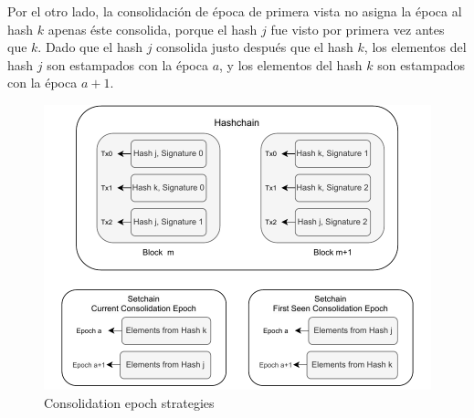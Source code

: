 %
Por el otro lado, la consolidación de época de primera vista no asigna la época al hash $k$
apenas éste consolida, porque el hash $j$ fue visto por primera vez antes que $k$.
%
Dado que el hash $j$ consolida justo después que el hash $k$, los elementos del hash $j$ son
estampados
con la época $a$, y los elementos del hash $k$ son estampados con la época $a+1$. 


\begin{figure}
  \centering
  \includegraphics[scale=0.5]{figures/consolidation_epoch.pdf}
  \caption{Consolidation epoch strategies}
  \label{fig:consolidation_epoch}
\end{figure}

